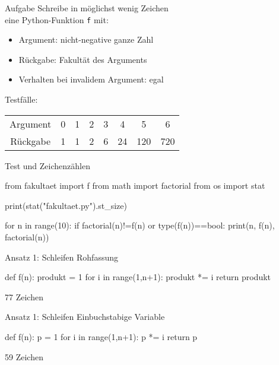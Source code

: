 \documentclass[xcolor=dvipsnames, aspectratio=43, 14pt]{beamer}
\begin{document}
\begin{frame}{Aufgabe}
	Schreibe in möglichst wenig Zeichen\\ eine Python-Funktion \texttt{f} mit:
	\begin{itemize}
		\item Argument: nicht-negative ganze Zahl
		\item Rückgabe: Fakultät des Arguments
		\item Verhalten bei invalidem Argument: egal
	\end{itemize}
	
	\vfill
	
	Testfälle:\\[0.5\baselineskip]
	\setlength{\tabcolsep}{10pt}
	\renewcommand{\arraystretch}{1.3}
	\begin{tabular}{@{}c|ccccccc}
		Argument & 0 & 1 & 2 & 3 & 4 & 5 & 6 \\
		Rückgabe & 1 & 1 & 2 & 6 & 24 & 120 & 720
	\end{tabular}
\end{frame}

\begin{frame}[fragile]{Test und Zeichenzählen}
	\begin{python3code}
	from fakultaet import f
	from math import factorial
	from os import stat
	
	print(stat("fakultaet.py").st_size)
	
	for n in range(10):
	   if factorial(n)!=f(n) or type(f(n))==bool:
	      print(n, f(n), factorial(n))
	\end{python3code}
\end{frame}

\begin{frame}[fragile]{Ansatz 1: Schleifen}
	Rohfassung
	
	\vfill
	
	\begin{python3code}
	def f(n):
	   produkt = 1
	   for i in range(1,n+1):
	      produkt *= i
	   return produkt
	\end{python3code}
	
	\vfill
	
	77 Zeichen
\end{frame}

\begin{frame}[fragile]{Ansatz 1: Schleifen}
	Einbuchstabige Variable\strut
	
	\vfill
	
	\begin{python3code}
	def f(n):
	   p = 1
	   for i in range(1,n+1):
	      p *= i
	   return p
	\end{python3code}
	
	\vfill
	
	59 Zeichen
\end{frame}
\end{document}
